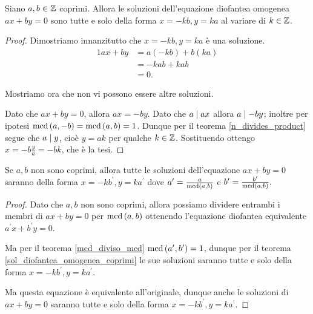 \begin{theorem} \label{sol_diofantea_omogenea_coprimi}
    Siano $a, b \in \mathbb{Z}$ coprimi. Allora le soluzioni dell'equazione diofantea omogenea $ax + by = 0$ sono tutte e solo della forma $x = -kb, y = ka$ al variare di $k \in \mathbb{Z}$.
\end{theorem}
\begin{proof}
    Dimostriamo innanzitutto che $x = -kb, y = ka$ è una soluzione.
    \begin{alignat*}{1}
        ax + by &= a(-kb) + b(ka)\\
                &= -kab + kab\\
                &= 0.
    \end{alignat*}

    Mostriamo ora che non vi possono essere altre soluzioni. 
    
    Dato che $ax + by = 0$, allora $ax = -by$.
    Dato che $a \mid ax$ allora $a \mid -by$; inoltre per ipotesi $\operatorname{mcd}\left(a, -b\right) = \operatorname{mcd}\left(a, b\right) = 1$.
    Dunque per il teorema \ref{n_divides_product} segue che $a \mid y$, cioè $y = ak$ per qualche $k \in \mathbb{Z}$. Sostituendo ottengo $x = -b\frac{y}{a} = -bk$, che è la tesi.
\end{proof}

\begin{corollary} \label{sol_diofantea_omogenea}
    Se $a, b$ non sono coprimi, allora tutte le soluzioni dell'equazione $ax + by = 0$ saranno della forma $x = -kb^\prime, y = ka^\prime$ dove $a^\prime = \frac{a}{\operatorname{mcd}\left(a, b\right)}$ e $b^\prime = \frac{b^\prime}{\operatorname{mcd}\left(a, b\right)}.$
\end{corollary}
\begin{proof}
    Dato che $a, b$ non sono coprimi, allora possiamo dividere entrambi i membri di $ax + by = 0$ per $\operatorname{mcd}\left(a, b\right)$ ottenendo l'equazione diofantea equivalente $a^\prime x + b^\prime y = 0$. 
    
    Ma per il teorema \ref{mcd_diviso_mcd} $\operatorname{mcd}\left(a^\prime, b^\prime\right) = 1$, dunque per il teorema \ref{sol_diofantea_omogenea_coprimi} le sue soluzioni saranno tutte e solo della forma $x = -kb^\prime, y = ka^\prime$. 
    
    Ma questa equazione è equivalente all'originale, dunque anche le soluzioni di $ax + by = 0$ saranno tutte e solo della forma $x = -kb^\prime, y = ka^\prime$.
\end{proof}

